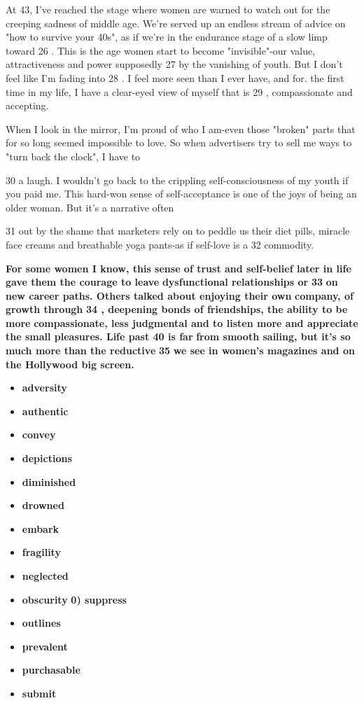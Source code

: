 \documentclass[UTF8,11pt]{ctexart}
\begin{document}
At 43, I've reached the stage where women are warned to watch out for the creeping sadness of middle age. We're served up an endless stream of advice on "how to survive your 40s", as if we're in the endurance stage of a slow limp toward 26 . This is the age women start to become "invisible"-our value, attractiveness and power supposedly 27 by the vanishing of youth. But I don't feel like I'm fading into 28 . I feel more seen than I ever have, and for. the first time in my life, I have a clear-eyed view of myself that is 29 , compassionate and accepting.


When I look in the mirror, I'm proud of who I am-even those "broken" parts that for so long seemed impossible to love. So when advertisers try to sell me ways to "turn back the clock", I have to


30 a laugh. I wouldn't go back to the crippling self-consciousness of my youth if you paid me. This hard-won sense of self-acceptance is one of the joys of being an older woman. But it's a narrative often


31 out by the shame that marketers rely on to peddle us their diet pills, miracle face creams and breathable yoga pants-as if self-love is a 32 commodity.


\textbf{For some women I know, this sense of trust and self-belief later in life gave them the courage to leave} \textbf{dysfunctional relationships or} \textbf{33} \textbf{on new career paths. Others talked about enjoying their own} \textbf{company, of growth through} \textbf{34 , deepening bonds of friendships, the ability to be more} \textbf{compassionate, less judgmental and to listen more and appreciate the small pleasures. Life past 40 is far} \textbf{from smooth sailing, but it's so much more than the reductive} \textbf{35} \textbf{we see in women's magazines and on} \textbf{the Hollywood big screen.}


\begin{itemize}[leftmargin=2em,itemsep=.2em,topsep=.4em]\item[A.] \textbf{adversity}
\item[B.] \textbf{authentic}
\item[C.] \textbf{convey}
\item[D.] \textbf{depictions}
\item[E.] \textbf{diminished}
\item[F.] \textbf{drowned}
\item[G.] \textbf{embark}
\item[H.] \textbf{fragility}
\item[I.] \textbf{neglected}
\item[J.] \textbf{obscurity} \textbf{0) suppress}
\item[K.] \textbf{outlines}
\item[L.] \textbf{prevalent}
\item[M.] \textbf{purchasable}
\item[N.] \textbf{submit}
\end{itemize}
\end{document}
